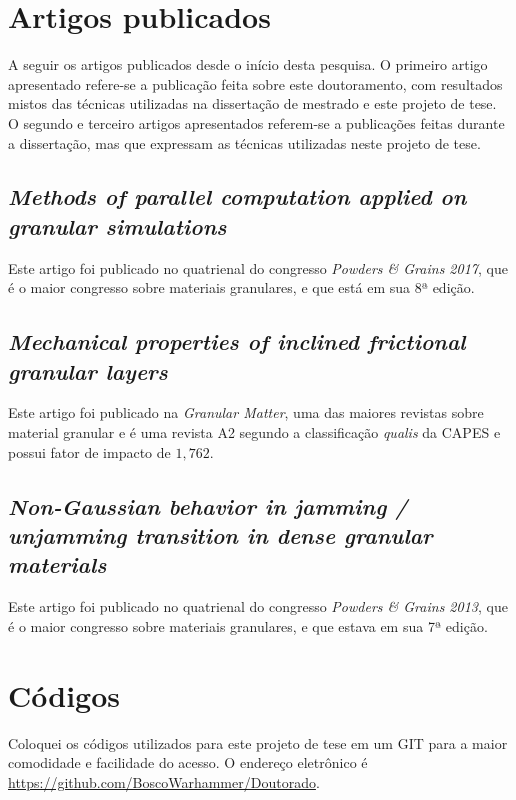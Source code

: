 \begin{apendicesenv}
\partapendices

\chapter{Artigos publicados}
\label{chap:Artigo}
    A seguir os artigos publicados desde o início desta pesquisa. O primeiro artigo apresentado refere-se a publicação feita sobre este doutoramento, com resultados mistos das técnicas utilizadas na dissertação de mestrado \cite{Dissertacao} e este projeto de tese. O segundo e terceiro artigos apresentados referem-se a publicações feitas durante a dissertação, mas que expressam as técnicas utilizadas neste projeto de tese.

\section{\textit{Methods of parallel computation applied on granular simulations}}

    Este artigo foi publicado no quatrienal do congresso \textit{Powders \& Grains 2017}, que é o maior congresso sobre materiais granulares, e que está em sua 8ª edição.



\section{\textit{Mechanical properties of inclined frictional granular layers}}

    Este artigo foi publicado na \textit{Granular Matter}, uma das maiores revistas sobre material granular e é uma revista A2 segundo a classificação \textit{qualis} da CAPES e possui fator de impacto de $1,762$.



\section{\textit{Non-Gaussian behavior in jamming / unjamming transition in dense granular materials}}

    Este artigo foi publicado no quatrienal do congresso \textit{Powders \& Grains 2013}, que é o maior congresso sobre materiais granulares, e que estava em sua 7ª edição.



\chapter{Códigos}

    Coloquei os códigos utilizados para este projeto de tese em um GIT para a maior comodidade e facilidade do acesso. O endereço eletrônico é \url{https://github.com/BoscoWarhammer/Doutorado}.

\end{apendicesenv}
